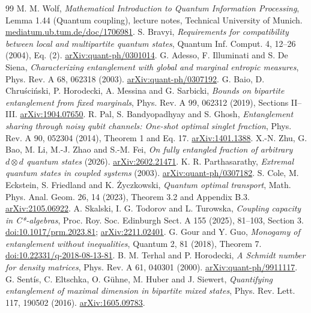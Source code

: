 \documentclass[11pt,a4paper]{article}
\theoremstyle{remark}\newtheorem{remark}[theorem]{Remark}
\begin{document}
\begin{thebibliography}{99}
 M. M. Wolf, \emph{Mathematical Introduction to Quantum Information Processing}, Lemma 1.44 (Quantum coupling), lecture notes, Technical University of Munich. \href{https://mediatum.ub.tum.de/doc/1706981/1706981.pdf}{mediatum.ub.tum.de/doc/1706981}.
 S. Bravyi, \emph{Requirements for compatibility between local and multipartite quantum states}, Quantum Inf. Comput. 4, 12--26 (2004), Eq. (2). \href{https://arxiv.org/abs/quant-ph/0301014}{arXiv:quant-ph/0301014}.
 G. Adesso, F. Illuminati and S. De Siena, \emph{Characterizing entanglement with global and marginal entropic measures}, Phys. Rev. A 68, 062318 (2003). \href{https://arxiv.org/abs/quant-ph/0307192}{arXiv:quant-ph/0307192}.
 G. Baio, D. Chru\'sci\'nski, P. Horodecki, A. Messina and G. Sarbicki, \emph{Bounds on bipartite entanglement from fixed marginals}, Phys. Rev. A 99, 062312 (2019), Sections II--III. \href{https://arxiv.org/abs/1904.07650}{arXiv:1904.07650}.
 R. Pal, S. Bandyopadhyay and S. Ghosh, \emph{Entanglement sharing through noisy qubit channels: One-shot optimal singlet fraction}, Phys. Rev. A 90, 052304 (2014), Theorem 1 and Eq. 17. \href{https://arxiv.org/abs/1401.1388}{arXiv:1401.1388}.
 X.-N. Zhu, G. Bao, M. Li, M.-J. Zhao and S.-M. Fei, \emph{On fully entangled fraction of arbitrary $d\otimes d$ quantum states} (2026). \href{https://arxiv.org/abs/2602.21471}{arXiv:2602.21471}.
 K. R. Parthasarathy, \emph{Extremal quantum states in coupled systems} (2003). \href{https://arxiv.org/abs/quant-ph/0307182}{arXiv:quant-ph/0307182}.
 S. Cole, M. Eckstein, S. Friedland and K. \.{Z}yczkowski, \emph{Quantum optimal transport}, Math. Phys. Anal. Geom. 26, 14 (2023), Theorem 3.2 and Appendix B.3. \href{https://arxiv.org/abs/2105.06922}{arXiv:2105.06922}.
 A. Skalski, I. G. Todorov and L. Turowska, \emph{Coupling capacity in C*-algebras}, Proc. Roy. Soc. Edinburgh Sect. A 155 (2025), 81--103, Section 3. \href{https://doi.org/10.1017/prm.2023.81}{doi:10.1017/prm.2023.81}; \href{https://arxiv.org/abs/2211.02401}{arXiv:2211.02401}.
 G. Gour and Y. Guo, \emph{Monogamy of entanglement without inequalities}, Quantum 2, 81 (2018), Theorem 7. \href{https://doi.org/10.22331/q-2018-08-13-81}{doi:10.22331/q-2018-08-13-81}.
 B. M. Terhal and P. Horodecki, \emph{A Schmidt number for density matrices}, Phys. Rev. A 61, 040301 (2000). \href{https://arxiv.org/abs/quant-ph/9911117}{arXiv:quant-ph/9911117}.
 G. Sent\'is, C. Eltschka, O. G\"uhne, M. Huber and J. Siewert, \emph{Quantifying entanglement of maximal dimension in bipartite mixed states}, Phys. Rev. Lett. 117, 190502 (2016). \href{https://arxiv.org/abs/1605.09783}{arXiv:1605.09783}.

\end{thebibliography}
\end{document}
